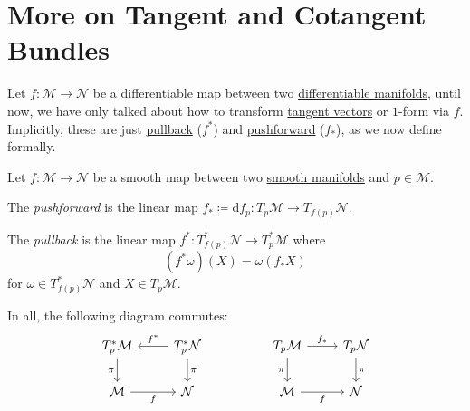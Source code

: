 \section{More on Tangent and Cotangent Bundles}
Let \(f\colon \mathcal{M} \to \mathcal{N} \) be a differentiable map between two \hyperref[def:smooth-manifold]{differentiable manifolds}, until now, we have only talked about how to transform \hyperref[def:tangent-vector]{tangent vectors} or \(1\)-form via \(f\). Implicitly, these are just \hyperref[def:pullback-one-form]{pullback} (\(f^{\ast} \)) and \hyperref[def:pushforward-tangent-vector]{pushforward} (\(f_{\ast}\)), as we now define formally.

\begin{definition*}
	Let \(f\colon \mathcal{M} \to \mathcal{N} \) be a smooth map between two \hyperref[def:smooth-manifold]{smooth manifolds} and \(p\in \mathcal{M} \).
	\begin{definition}[Pushforward]\label{def:pushforward-tangent-vector}
		The \emph{pushforward} is the linear map \(f_{\ast} \coloneqq \mathrm{d} f_p \colon T_p \mathcal{M} \to T_{f(p)} \mathcal{N}\).
	\end{definition}

	\begin{definition}[Pullback]\label{def:pullback-one-form}
		The \emph{pullback} is the linear map \(f^{\ast} \colon T^{\ast} _{f(p)} \mathcal{N} \to T^{\ast} _p \mathcal{M} \) where
		\[
			(f^{\ast} \omega )(X) = \omega (f_\ast X)
		\]
		for \(\omega \in T_{f(p)}^{\ast} \mathcal{N} \) and \(X\in T_p \mathcal{M} \).
	\end{definition}
\end{definition*}

In all, the following diagram commutes:
\[
	\begin{tikzcd}
		{T^*_p\mathcal{M}} & {T^*_p\mathcal{N}} && {T_p\mathcal{M}} & {T_p\mathcal{N}} \\
		{\mathcal{M}} & {\mathcal{N}} && {\mathcal{M}} & {\mathcal{N}}
		\arrow["\pi"', from=1-4, to=2-4]
		\arrow["\pi", from=1-5, to=2-5]
		\arrow["{f_\ast}", from=1-4, to=1-5]
		\arrow["f"', from=2-4, to=2-5]
		\arrow["{f^\ast}"', from=1-2, to=1-1]
		\arrow["\pi", from=1-2, to=2-2]
		\arrow["\pi"', from=1-1, to=2-1]
		\arrow["f"', from=2-1, to=2-2]
	\end{tikzcd}
\]


